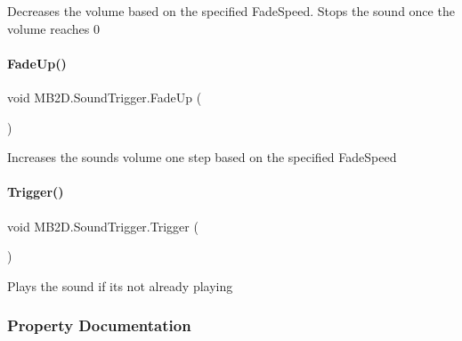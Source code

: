 Decreases the volume based on the specified Fade\+Speed. Stops the sound once the volume reaches 0 

\hypertarget{class_m_b2_d_1_1_sound_trigger_a677d10464891b21b44da3811430d5bea}{}\label{class_m_b2_d_1_1_sound_trigger_a677d10464891b21b44da3811430d5bea} 
\paragraph{\texorpdfstring{Fade\+Up()}{FadeUp()}}
{\footnotesize\ttfamily void M\+B2\+D.\+Sound\+Trigger.\+Fade\+Up (\begin{DoxyParamCaption}{ }\end{DoxyParamCaption})\hspace{0.3cm}{\ttfamily [inline]}}



Increases the sounds volume one step based on the specified Fade\+Speed 

\hypertarget{class_m_b2_d_1_1_sound_trigger_a1387225550eb222ebbf70a8e097907a3}{}\label{class_m_b2_d_1_1_sound_trigger_a1387225550eb222ebbf70a8e097907a3} 
\paragraph{\texorpdfstring{Trigger()}{Trigger()}}
{\footnotesize\ttfamily void M\+B2\+D.\+Sound\+Trigger.\+Trigger (\begin{DoxyParamCaption}{ }\end{DoxyParamCaption})\hspace{0.3cm}{\ttfamily [inline]}}



Plays the sound if it\textquotesingle{}s not already playing 



\subsubsection{Property Documentation}
\hypertarget{class_m_b2_d_1_1_sound_trigger_aff38429508a9f7d6d63e21ccb9605c16}{}\label{class_m_b2_d_1_1_sound_trigger_aff38429508a9f7d6d63e21ccb9605c16} 

